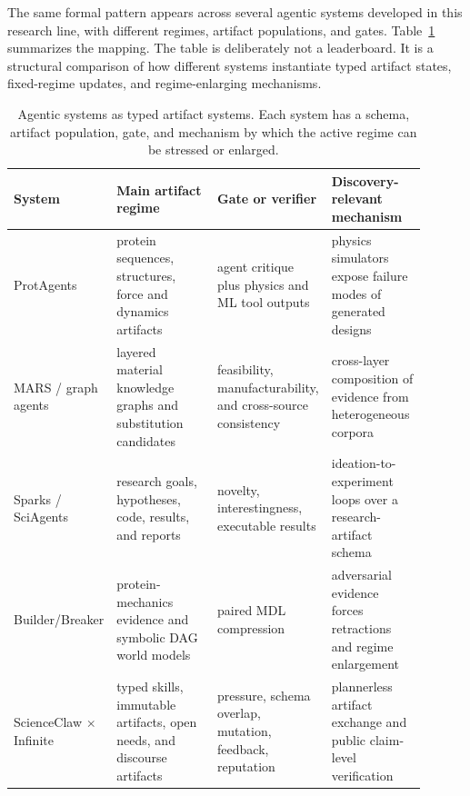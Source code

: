\documentclass[11pt]{article}
\theoremstyle{definition}
\begin{document}
The same formal pattern appears across several agentic systems developed in this research line, with different regimes, artifact populations, and gates. Table~\ref{tab:systems} summarizes the mapping. The table is deliberately not a leaderboard. It is a structural comparison of how different systems instantiate typed artifact states, fixed-regime updates, and regime-enlarging mechanisms.

\begin{table}[t]
\centering
\footnotesize
\setlength{\tabcolsep}{3pt}
\begin{tabular}{@{}>{\raggedright\arraybackslash}p{0.17\linewidth}>{\raggedright\arraybackslash}p{0.25\linewidth}>{\raggedright\arraybackslash}p{0.25\linewidth}>{\raggedright\arraybackslash}p{0.23\linewidth}@{}}
\toprule
System & Main artifact regime & Gate or verifier & Discovery-relevant mechanism \\
\midrule
ProtAgents \citep{ghafarollahi_protagents_2024} & protein sequences, structures, force and dynamics artifacts & agent critique plus physics and ML tool outputs & physics simulators expose failure modes of generated designs \\
MARS / graph agents & layered material knowledge graphs and substitution candidates & feasibility, manufacturability, and cross-source consistency & cross-layer composition of evidence from heterogeneous corpora \\
Sparks / SciAgents \citep{ghafarollahi_sparks_2025,ghafarollahi_sciagents_2025} & research goals, hypotheses, code, results, and reports & novelty, interestingness, executable results & ideation-to-experiment loops over a research-artifact schema \\
Builder/Breaker \citep{buehler_break_world_2026} & protein-mechanics evidence and symbolic DAG world models & paired MDL compression & adversarial evidence forces retractions and regime enlargement \\
ScienceClaw $\times$ Infinite \citep{wang_scienceclaw_infinite_2026} & typed skills, immutable artifacts, open needs, and discourse artifacts & pressure, schema overlap, mutation, feedback, reputation & plannerless artifact exchange and public claim-level verification \\
\bottomrule
\end{tabular}
\caption{Agentic systems as typed artifact systems. Each system has a schema, artifact population, gate, and mechanism by which the active regime can be stressed or enlarged.}
\label{tab:systems}
\end{table}
\end{document}
